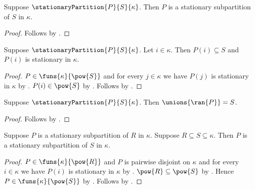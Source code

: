 \begin{proposition}\label{stationary_partition_is_subpartition}
    Suppose $\stationaryPartition{P}{S}{\kappa}$.
    Then $P$ is a stationary subpartition of $S$ in $\kappa$.
\end{proposition}
\begin{proof}
    Follows by .
\end{proof}

\begin{proposition}\label{stationary_partition_cell}
    Suppose $\stationaryPartition{P}{S}{\kappa}$.
    Let $i\in\kappa$.
    Then $P(i)\subseteq S$ and $P(i)$ is stationary in $\kappa$.
\end{proposition}
\begin{proof}
    $P\in\funs{\kappa}{\pow{S}}$ and
        for every $j\in\kappa$ we have $P(j)$ is stationary in $\kappa$
        by .
    $P(i)\in\pow{S}$ by .
    Follows by .
\end{proof}

\begin{proposition}\label{stationary_partition_cover}
    Suppose $\stationaryPartition{P}{S}{\kappa}$.
    Then $\unions{\ran{P}}=S$.
\end{proposition}
\begin{proof}
    Follows by .
\end{proof}

\begin{proposition}\label{stationary_subpartition_superset}
    Suppose $P$ is a stationary subpartition of $R$ in $\kappa$.
    Suppose $R\subseteq S\subseteq\kappa$.
    Then $P$ is a stationary subpartition of $S$ in $\kappa$.
\end{proposition}
\begin{proof}
    $P\in\funs{\kappa}{\pow{R}}$ and
        $P$ is pairwise disjoint on $\kappa$ and
        for every $i\in\kappa$ we have $P(i)$ is stationary in $\kappa$
        by .
    $\pow{R}\subseteq\pow{S}$ by .
    Hence $P\in\funs{\kappa}{\pow{S}}$ by .
    Follows by .
\end{proof}

